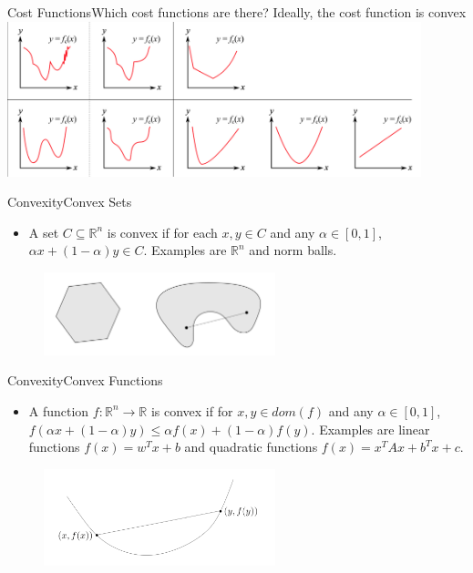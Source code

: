 \begin{frame}{Cost Functions}{Which cost functions are there? Ideally, the cost function is convex}
	\\
	\vspace{0.4cm}
	\includegraphics[width=0.9\textwidth]{02_math/02_img/costfunctions.png}
\end{frame}

\begin{frame}{Convexity}{Convex Sets}
	\begin{itemize}
		\item A set $C \subseteq \mathbb{R}^n$ is convex if for each $x, y \in C$ and any $\alpha \in [0,1]$, $\alpha x + (1 - \alpha)y \in C$. Examples are $\mathbb{R}^n$ and norm balls.\\
	\end{itemize}
	\begin{figure}
		\center
		\includegraphics[width=0.6\textwidth]{02_math/02_img/convexsets.png}
	\end{figure}
\end{frame}

\begin{frame}{Convexity}{Convex Functions}
	\begin{itemize}
		\item A function $f : \mathbb{R}^n \rightarrow \mathbb{R}$ is convex if for $x, y \in dom(f)$ and any $\alpha \in [0,1]$, $f(\alpha x + (1 - \alpha)y) \le \alpha f(x) + (1 - \alpha)f(y)$. Examples are linear functions $f(x) = w^Tx + b$ and quadratic functions $f(x) = x^TAx + b^Tx + c$.\\
	\end{itemize}
	\begin{figure}
		\center
		\includegraphics[width=0.6\textwidth]{02_math/02_img/convexfunction.png}
	\end{figure}
\end{frame}


